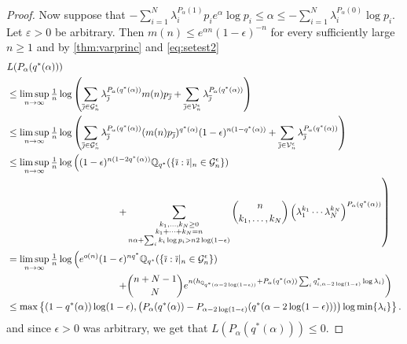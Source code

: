 \documentclass[12pt,]{article}
\theoremstyle{definition}
\theoremstyle{remark}
\renewcommand{\Bbb}[1]{\mathbb{#1}}
\newcommand{\bbQ}{{\Bbb Q}}         %
\newcommand{\cG}{{\cal G}}
\newcommand{\cV}{{\cal V}}
\newcommand{\0}{\mathbf{0}}
\newcommand{\bi}{{\overline {\imath}}}
\newcommand{\bj}{{\overline  {\jmath}}}
\begin{document}
\begin{proof}
  Now suppose that $-\sum_{i=1}^N\lambda_i^{P_\alpha(1)}p_ie^\alpha \log
  p_i\leq\alpha\leq-\sum_{i=1}^N\lambda_i^{P_\alpha(0)}\log p_i$. Let $\varepsilon>0$ be arbitrary.
  Then $m(n)\leq e^{\alpha n}(1-\epsilon)^{-n}$ for every sufficiently large $n\geq1$ and by
  \cref{thm:varprinc} and \cref{eq:setest2}
  \[
    \begin{split}
&L(P_\alpha(q^*(\alpha)))
\\
&\leq\limsup_{n\to \infty} \tfrac 1n \log\left( \sum_{\bj\in \cG_n^\epsilon}\lambda_{\bj}^{P_\alpha(q^*(\alpha))}m(n)p_{\bj}+\sum_{\bj\in \cV_n^\epsilon}\lambda_{\bj}^{P_\alpha(q^*(\alpha))}\right)\\
&\leq\limsup_{n\to \infty} \tfrac 1n \log\left( \sum_{\bj\in \cG_n^\epsilon}\lambda_{\bj}^{P_\alpha(q^*(\alpha))}(m(n)p_{\bj})^{q^*(\alpha)}(1-\epsilon)^{n(1-q^*(\alpha))}+\sum_{\bj\in \cV_n^\epsilon}\lambda_{\bj}^{P_\alpha(q^*(\alpha))}\right)\\
&\leq \limsup_{n\to \infty} \tfrac 1n \log\left((1-\epsilon)^{n(1-2q^*(\alpha))}\bbQ_{q^*}(\{\bi:\bi|_n\in\cG_n^\epsilon\})\right.\\
&\left.\hspace{4cm}+ \sum_{\substack{k_1,\ldots,k_N\geq0\\k_1+\cdots+k_N=n\\n\alpha+\sum_{i}k_i\log p_i>n2\log(1-\epsilon)}}\binom{n}{k_1,\ldots,k_N}\left(\lambda_1^{k_1}\cdots\lambda_N^{k_N}\right)^{P_{\alpha}(q^*(\alpha))}\right)\\
&=\limsup_{n\to \infty} \tfrac 1n
\log\left(e^{o(n)}(1-\epsilon)^{nq^*}\bbQ_{q^*}(\{\bi:\bi|_n\in\cG_n^\epsilon\})\right.\\
&\left.\hspace{4cm}+ \binom{n+N-1}{N}e^{n(h_{\bbQ_{q^*(\alpha-2\log(1-\epsilon))}}+P_{\alpha}(q^*(\alpha))\sum_{i}q_{i,\alpha-2\log(1-\epsilon)}^*\log\lambda_i)}\right)\\
&\leq\max\left\{ (1-q^*(\alpha))\log(1-\epsilon),\left(P_\alpha(q^*(\alpha))-P_{\alpha-2\log(1-\epsilon)}(q^*(\alpha-2\log(1-\epsilon)))\right)\log\min\{\lambda_i\}\right\}.
    \end{split}
  \]
  and since $\epsilon>0$ was arbitrary, we get that $L(P_\alpha(q^*(\alpha)))\leq0$.


\end{proof}
\end{document}
